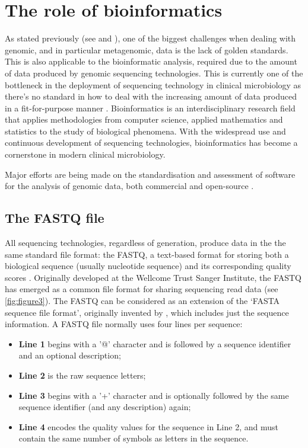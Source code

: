 \section{The role of bioinformatics} \label{sec:bioinformatics}

As stated previously (see  and ), one of the biggest challenges when dealing with genomic, and in particular metagenomic, data is the lack of golden standards. This is also applicable to the bioinformatic analysis, required due to the amount of data produced by genomic sequencing technologies. This is currently one of the bottleneck in the deployment of sequencing technology in clinical microbiology as there's no standard in how to deal with the increasing amount of data produced in a fit-for-purpose manner \citep{carrico_primer_2018}. Bioinformatics is an interdisciplinary research field that applies methodologies from computer science, applied mathematics and statistics to the study of biological phenomena\citep{carrico_primer_2018}. With the widespread use and continuous development of sequencing technologies, bioinformatics has become a cornerstone in modern clinical microbiology. 

Major efforts are being made on the standardisation and assessment of software for the analysis of genomic data, both commercial and open-source \cite{angers-loustau_challenges_2018, gruening_recommendations_2019, sczyrba_critical_2017, couto_critical_2018}. 

\subsection{The FASTQ file}

All sequencing technologies, regardless of generation, produce data in the the same standard file format: the FASTQ, a text-based format for storing both a biological sequence (usually nucleotide sequence) and its corresponding quality scores \citep{cock_sanger_2010}. Originally developed at the Wellcome Trust Sanger Institute, the FASTQ has emerged as a common file format for sharing sequencing read data (see \ref{fig:figure3}). The FASTQ can be considered as an extension of the ‘FASTA sequence file format’, originally invented by \cite{pearson_improved_1988}, which includes just the sequence information. A FASTQ file normally uses four lines per sequence:

\begin{itemize}
    \item \textbf{Line 1} begins with a '@' character and is followed by a sequence identifier and an optional description;
    \item \textbf{Line 2} is the raw sequence letters;
    \item \textbf{Line 3} begins with a '+' character and is optionally followed by the same sequence identifier (and any description) again;
    \item \textbf{Line 4} encodes the quality values for the sequence in Line 2, and must contain the same number of symbols as letters in the sequence.
\end{itemize}

